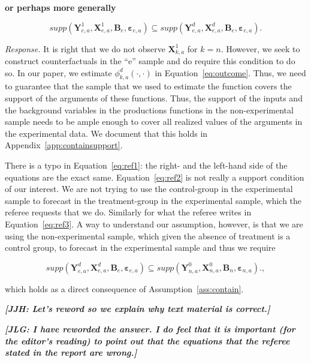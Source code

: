 \textbf{or perhaps more generally}

\begin{equation}
supp( \bm{Y}_{e,a}^1, \bm{X}^1_{e,a}, \bm{B}_e, \bm{\varepsilon}_{e,a} ) \subseteq supp( \bm{Y}_{e,a}^d, \bm{X}^d_{e,a}, \bm{B}_e, \bm{\varepsilon}_{e,a} ).  \label{eq:ref3}
\end{equation}

\noindent \textit{Response.} It is right that we do not observe $\bm{X}_{k,a}^1$ for $k = n$. However, we seek to construct counterfactuals in the ``e'' sample and do require this condition to do so. In our paper, we estimate $\phi_{k,a}^d \left( \cdot, \cdot \right)$ in Equation~\eqref{eq:outcome}. Thus, we need to guarantee that the sample that we used to estimate the function covers the support of the arguments of these functions. Thus, the support of the inputs and the background variables in the productions functions in the non-experimental sample needs to be ample enough to cover all realized values of the arguments in the experimental data. We document that this holds in Appendix~\ref{app:containsupport}. 

There is a typo in Equation~\eqref{eq:ref1}: the right- and the left-hand side of the equations are the exact same. Equation~\eqref{eq:ref2} is not really a support condition of our interest. We are not trying to use the control-group in the experimental sample to forecast in the treatment-group in the experimental sample, which the referee requests that we do. Similarly for what the referee writes in Equation~\eqref{eq:ref3}. A way to understand our assumption, however, is that we are using the non-experimental sample, which given the absence of treatment is a control group, to forecast in the experimental sample and thus we require

\begin{equation}
supp( \bm{Y}_{e,a}^d, \bm{X}^d_{e,a}, \bm{B}_e, \bm{\varepsilon}_{e,a} ) \subseteq supp( \bm{Y}_{n,a}^0, \bm{X}^0_{n,a}, \bm{B}_n, \bm{\varepsilon}_{n,a} ).  \label{eq:ref4},
\end{equation}

which holds as a direct consequence of Assumption~\ref{ass:contain}. 

\textbf{\textit{[JJH: Let's reword so we explain why text material is correct.]}}

\textbf{\textit{[JLG: I have reworded the answer. I do feel that it is important (for the editor's reading) to point out that the equations that the referee stated in the report are wrong.]}}

